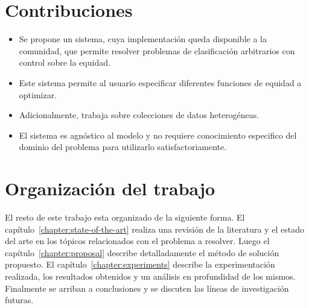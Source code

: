 
\section*{Contribuciones}

\begin{itemize}
    \item Se propone un sistema, cuya implementación queda disponible a la comunidad, que permite resolver problemas de clasificación arbitrarios con control sobre la equidad.
    \item Este sistema permite al usuario especificar diferentes funciones de equidad a optimizar.
    \item Adicionalmente, trabaja sobre colecciones de datos heterogéneas.
    \item El sistema es agnóstico al modelo y no requiere conocimiento especifico del dominio del problema para utilizarlo satisfactoriamente.
\end{itemize}

\section*{Organización del trabajo}

El resto de este trabajo esta organizado de la siguiente forma.
El capítulo~\ref{chapter:state-of-the-art} realiza una revisión de la literatura y el estado del arte en los tópicos relacionados con el problema a resolver.
Luego el capítulo~\ref{chapter:proposal} describe detalladamente el método de solución propuesto.
El capítulo~\ref{chapter:experiments} describe la experimentación realizada, los resultados obtenidos y un análisis en profundidad de los mismos.
Finalmente se arriban a conclusiones y se discuten las líneas de investigación futuras.